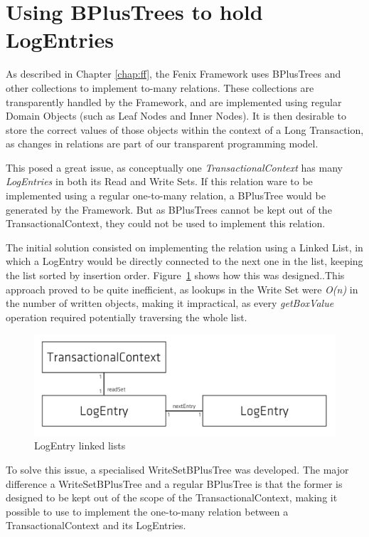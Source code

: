 \section{Using BPlusTrees to hold LogEntries}

As described in Chapter \ref{chap:ff}, the Fenix Framework uses
BPlusTrees and other collections to implement to-many relations. These
collections are transparently handled by the Framework, and are
implemented using regular Domain Objects (such as Leaf Nodes and Inner
Nodes). It is then desirable to store the correct values of those
objects within the context of a Long Transaction, as changes in
relations are part of our transparent programming model.

This posed a great issue, as conceptually one {\it
  TransactionalContext} has many {\it LogEntries} in both its Read and
Write Sets. If this relation ware to be implemented using a regular
one-to-many relation, a BPlusTree would be generated by the
Framework. But as BPlusTrees cannot be kept out of the
TransactionalContext, they could not be used to implement this relation.

The initial solution consisted on implementing the relation using a
Linked List, in which a LogEntry would be directly connected to the
next one in the list, keeping the list sorted by insertion
order. Figure~\ref{fig:linkedList} shows how this was designed..This
approach proved to be quite inefficient, as lookups in the Write Set
were {\it O(n)} in the number of written objects, making it
impractical, as every {\it getBoxValue} operation required potentially
traversing the whole list.

\begin{figure}
\centering
\includegraphics[width=0.7\linewidth]{tx-context-v1}
\caption{LogEntry linked lists}
\label{fig:linkedList}
\end{figure}

To solve this issue, a specialised WriteSetBPlusTree was
developed. The major difference a WriteSetBPlusTree and a regular
BPlusTree is that the former is designed to be kept out of the scope
of the TransactionalContext, making it possible to use to implement
the one-to-many relation between a TransactionalContext and its
LogEntries.

